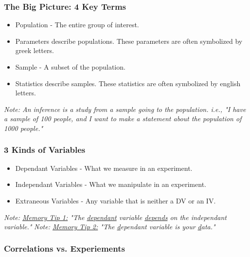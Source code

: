 \documentclass[11pt]{report}
\begin{document}
\subsubsection{The Big Picture: 4 Key Terms}
{
    \begin{itemize}
        \item Population - The entire group of interest. 
        \item Parameters describe populations. These parameters are often symbolized by greek letters.
        \item Sample - A subset of the population.
        \item Statistics describe samples. These statistics are often symbolized by english letters.
    \end{itemize}
    \textit{Note: An inference is a study from a sample going to the population. i.e., "I have a sample of 100 people, and I want to make a statement about the population of 1000 people."}
}

\subsubsection{3 Kinds of Variables}
{
    \begin{itemize}
        \item Dependant Variables - What we measure in an experiment.
        \item Independant Variables - What we manipulate in an experiment.
        \item Extraneous Variables - Any variable that is neither a DV or an IV. 
    \end{itemize}
    \textit{Note: \underline{Memory Tip 1:} "The \underline{dependant} variable \underline{depends} on the independant variable."} \newline
    \textit{Note: \underline{Memory Tip 2:} "The \underline{d}ependant variable is your \underline{d}ata."}
}

\subsubsection{Correlations vs. Experiements} 
\end{document}
